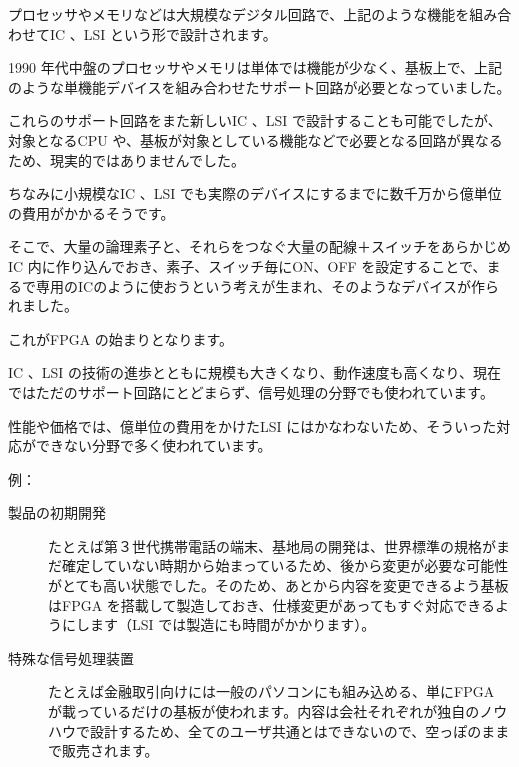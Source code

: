 \documentclass[letterpaper,10pt,dvipdfmx]{sphinxmanual}
\begin{document}
プロセッサやメモリなどは大規模なデジタル回路で、上記のような機能を組み合わせてIC 、LSI という形で設計されます。

1990 年代中盤のプロセッサやメモリは単体では機能が少なく、基板上で、上記のような単機能デバイスを組み合わせたサポート回路が必要となっていました。

これらのサポート回路をまた新しいIC 、LSI で設計することも可能でしたが、対象となるCPU や、基板が対象としている機能などで必要となる回路が異なるため、現実的ではありませんでした。

ちなみに小規模なIC 、LSI でも実際のデバイスにするまでに数千万から億単位の費用がかかるそうです。

そこで、大量の論理素子と、それらをつなぐ大量の配線＋スイッチをあらかじめIC 内に作り込んでおき、素子、スイッチ毎にON、OFF を設定することで、まるで専用のICのように使おうという考えが生まれ、そのようなデバイスが作られました。

これがFPGA の始まりとなります。

IC 、LSI の技術の進歩とともに規模も大きくなり、動作速度も高くなり、現在ではただのサポート回路にとどまらず、信号処理の分野でも使われています。

性能や価格では、億単位の費用をかけたLSI にはかなわないため、そういった対応ができない分野で多く使われています。

例：
\begin{description}
\item[{製品の初期開発}] \leavevmode
たとえば第３世代携帯電話の端末、基地局の開発は、世界標準の規格がまだ確定していない時期から始まっているため、後から変更が必要な可能性がとても高い状態でした。そのため、あとから内容を変更できるよう基板はFPGA を搭載して製造しておき、仕様変更があってもすぐ対応できるようにします（LSI では製造にも時間がかかります）。

\item[{特殊な信号処理装置}] \leavevmode
たとえば金融取引向けには一般のパソコンにも組み込める、単にFPGA が載っているだけの基板が使われます。内容は会社それぞれが独自のノウハウで設計するため、全てのユーザ共通とはできないので、空っぽのままで販売されます。

\end{description}
\end{document}
